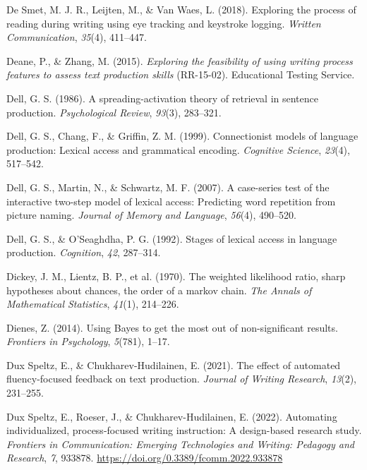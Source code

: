 \documentclass[
  man,floatsintext]{apa7}
\newlength{\cslhangindent}
\newlength{\cslentryspacingunit} %
\newenvironment{CSLReferences}[2] %
 {%
  \setlength{\parindent}{0pt}
  \ifodd #1
  \let\oldpar\par
  \def\par{\hangindent=\cslhangindent\oldpar}
  \fi
  \setlength{\parskip}{#2\cslentryspacingunit}
 }%
 {}
\begin{document}
\begin{CSLReferences}{1}{0}
\leavevmode{}%
De Smet, M. J. R., Leijten, M., \& Van Waes, L. (2018). Exploring the process of reading during writing using eye tracking and keystroke logging. \emph{Written Communication}, \emph{35}(4), 411--447.

\leavevmode{}%
Deane, P., \& Zhang, M. (2015). \emph{Exploring the feasibility of using writing process features to assess text production skills} (RR-15-02). Educational Testing Service.

\leavevmode{}%
Dell, G. S. (1986). A spreading-activation theory of retrieval in sentence production. \emph{Psychological Review}, \emph{93}(3), 283--321.

\leavevmode{}%
Dell, G. S., Chang, F., \& Griffin, Z. M. (1999). Connectionist models of language production: Lexical access and grammatical encoding. \emph{Cognitive Science}, \emph{23}(4), 517--542.

\leavevmode{}%
Dell, G. S., Martin, N., \& Schwartz, M. F. (2007). A case-series test of the interactive two-step model of lexical access: Predicting word repetition from picture naming. \emph{Journal of Memory and Language}, \emph{56}(4), 490--520.

\leavevmode{}%
Dell, G. S., \& O'Seaghdha, P. G. (1992). Stages of lexical access in language production. \emph{Cognition}, \emph{42}, 287--314.

\leavevmode{}%
Dickey, J. M., Lientz, B. P., et al. (1970). The weighted likelihood ratio, sharp hypotheses about chances, the order of a markov chain. \emph{The Annals of Mathematical Statistics}, \emph{41}(1), 214--226.

\leavevmode{}%
Dienes, Z. (2014). Using {B}ayes to get the most out of non-significant results. \emph{Frontiers in Psychology}, \emph{5}(781), 1--17.

\leavevmode{}%
Dux Speltz, E., \& Chukharev-Hudilainen, E. (2021). The effect of automated fluency-focused feedback on text production. \emph{Journal of Writing Research}, \emph{13}(2), 231--255.

\leavevmode{}%
Dux Speltz, E., Roeser, J., \& Chukharev-Hudilainen, E. (2022). Automating individualized, process-focused writing instruction: A design-based research study. \emph{Frontiers in Communication: Emerging Technologies and Writing: Pedagogy and Research}, \emph{7}, 933878. \url{https://doi.org/0.3389/fcomm.2022.933878}


\end{CSLReferences}
\end{document}
